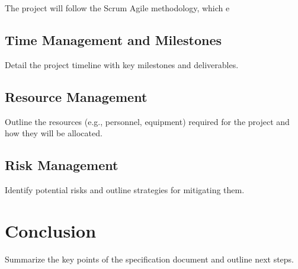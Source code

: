 \documentclass[12pt]{article}
\begin{document}
    The project will follow the Scrum Agile methodology, which e

    \subsection{Time Management and Milestones}
    Detail the project timeline with key milestones and deliverables.

    \subsection{Resource Management}
    Outline the resources (e.g., personnel, equipment) required for the project and how they will be allocated.

    \subsection{Risk Management}
    Identify potential risks and outline strategies for mitigating them.

\section{Conclusion}
Summarize the key points of the specification document and outline next steps.
\end{document}
